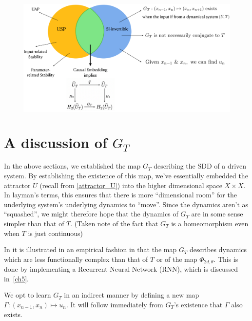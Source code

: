 \documentclass[a4paper,12pt,twoside]{report}
\begin{document}
\begin{figure}[ht]
  \includegraphics[scale=0.3]{_summarypictorial.eps}
  \centering
  \label{fig:fig_pictorialSummary}
\end{figure}




\section{A discussion of $G_T$ }

In the above sections, we established the map $G_T$ describing the SDD of a driven system. By establishing the existence of this map, we’ve essentially embedded the attractor $U$ (recall from \ref{attractor_U}) into the higher dimensional space $X\times{X}$.
In layman’s terms, this ensures that there is more “dimensional room” for the underlying system’s underlying dynamics to “move”. Since the dynamics aren’t as “squashed”, we might therefore hope that the dynamics of $G_T$ are in some sense simpler than that of $T$. (Taken note of the fact that $G_T$ is a homeomorphism even when $T$ is just continuous)
 
In \cite{manjunath2021universal} it is illustrated in an empirical fashion in that the map $G_T$ describes dynamics which are less functionally complex than that of $T$ or of the map $\Phi_{2d,\theta}$. This is done by implementing a Recurrent Neural Network (RNN), which is discussed in~\ref{ch5}. 
 
We opt to learn $G_T$ in an indirect manner by defining a new map $\Gamma:(x_{n-1},x_n)\mapsto{u_n}$. It will follow immediately from $G_T$’s existence that $\Gamma$ also exists. 
\end{document}

